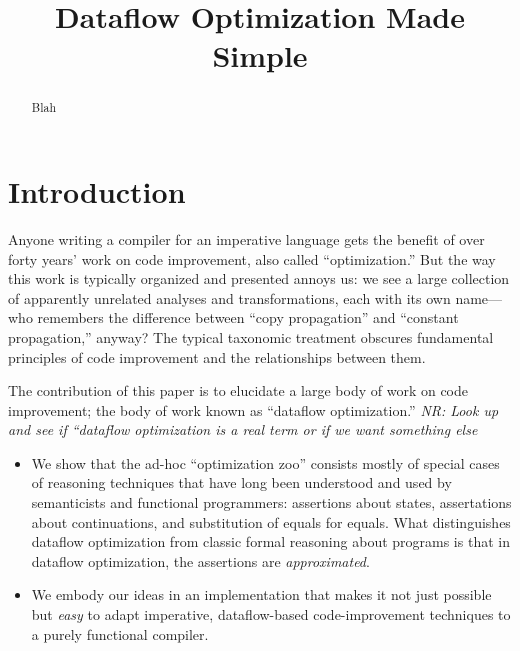 \documentclass[blockstyle,preprint,nocopyrightspace]{sigplanconf}
\newcommand{\authornote}[1]{{\em #1}}
\newcommand{\norman}[1]{\authornote{NR: #1}}
\let\remark\norman
\begin{document}
\title{Dataflow Optimization Made Simple}



\maketitle
 
\begin{abstract}
Blah
\end{abstract}

\makeatactive   %

\section{Introduction}

Anyone writing a compiler for an imperative language gets the benefit
of over forty years' work on code improvement, also called
``optimization.''
But the way this work is typically organized and presented annoys us: 
we see a large collection of apparently unrelated analyses and
transformations, each with its own name---who remembers the difference
between ``copy propagation'' and ``constant propagation,'' anyway?
The typical taxonomic treatment obscures fundamental principles of
code improvement and the relationships between them.

The contribution of this paper is to elucidate a large body of work on code
improvement; the body of work known as ``dataflow optimization.''
\remark{Look up and see if ``dataflow optimization is a real term or
  if we want something else}
\begin{itemize}
\item
We show that the ad-hoc ``optimization zoo'' consists mostly of special
cases of reasoning techniques that have long been understood and used
by semanticists and functional programmers:
assertions about states, assertations about continuations, and
substitution of equals for equals.
What distinguishes dataflow optimization from classic formal reasoning
about programs is that in dataflow optimization, the assertions are
\emph{approximated}. 
\item
We embody our ideas in an implementation that makes it not just
possible but \emph{easy} to adapt imperative, dataflow-based
code-improvement techniques to a purely functional compiler.
\end{itemize}
\end{document}
